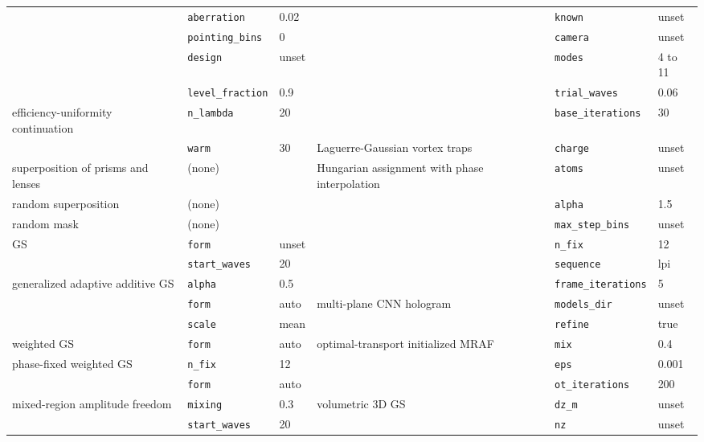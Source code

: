 \begin{table}[t]
\begin{tabular}{@{}>{\raggedright\arraybackslash}p{} l l @{\hskip 1.2em} >{\raggedright\arraybackslash}p{} l l@{}}
 & \texttt{aberration} & 0.02 &  & \texttt{known} & unset\\
 & \texttt{pointing\_bins} & 0 &  & \texttt{camera} & unset\\
 & \texttt{design} & unset &  & \texttt{modes} & 4 to 11\\
 & \texttt{level\_fraction} & 0.9 &  & \texttt{trial\_waves} & 0.06\\
efficiency-uniformity continuation & \texttt{n\_lambda} & 20 &  & \texttt{base\_iterations} & 30\\
 & \texttt{warm} & 30 & Laguerre-Gaussian vortex traps & \texttt{charge} & unset\\
superposition of prisms and lenses & (none) &  & Hungarian assignment with phase interpolation & \texttt{atoms} & unset\\
random superposition & (none) &  &  & \texttt{alpha} & 1.5\\
random mask & (none) &  &  & \texttt{max\_step\_bins} & unset\\
GS & \texttt{form} & unset &  & \texttt{n\_fix} & 12\\
 & \texttt{start\_waves} & 20 &  & \texttt{sequence} & lpi\\
generalized adaptive additive GS & \texttt{alpha} & 0.5 &  & \texttt{frame\_iterations} & 5\\
 & \texttt{form} & auto & multi-plane CNN hologram & \texttt{models\_dir} & unset\\
 & \texttt{scale} & mean &  & \texttt{refine} & true\\
weighted GS & \texttt{form} & auto & optimal-transport initialized MRAF & \texttt{mix} & 0.4\\
phase-fixed weighted GS & \texttt{n\_fix} & 12 &  & \texttt{eps} & 0.001\\
 & \texttt{form} & auto &  & \texttt{ot\_iterations} & 200\\
mixed-region amplitude freedom & \texttt{mixing} & 0.3 & volumetric 3D GS & \texttt{dz\_m} & unset\\
 & \texttt{start\_waves} & 20 &  & \texttt{nz} & unset\\
\bottomrule\end{tabular}\end{table}
